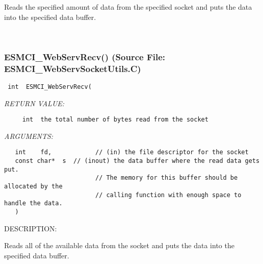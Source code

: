       Reads the specified amount of data from the specified socket and
      puts the data into the specified data buffer.
   
 
\mbox{}\hrulefill\
 
\subsubsection{ESMCI\_WebServRecv() (Source File: ESMCI\_WebServSocketUtils.C)}


  
\begin{verbatim} int  ESMCI_WebServRecv(\end{verbatim}{\em RETURN VALUE:}
\begin{verbatim}     int  the total number of bytes read from the socket\end{verbatim}{\em ARGUMENTS:}
\begin{verbatim}   int    fd,            // (in) the file descriptor for the socket
   const char*  s  // (inout) the data buffer where the read data gets put.
                         // The memory for this buffer should be allocated by the
                         // calling function with enough space to handle the data.
   )\end{verbatim}
{\sf DESCRIPTION:\\ }


      Reads all of the available data from the socket and puts the data
      into the specified data buffer.
  
\setlength{\parskip}{\oldparskip}
\setlength{\parindent}{\oldparindent}
\setlength{\baselineskip}{\oldbaselineskip}
